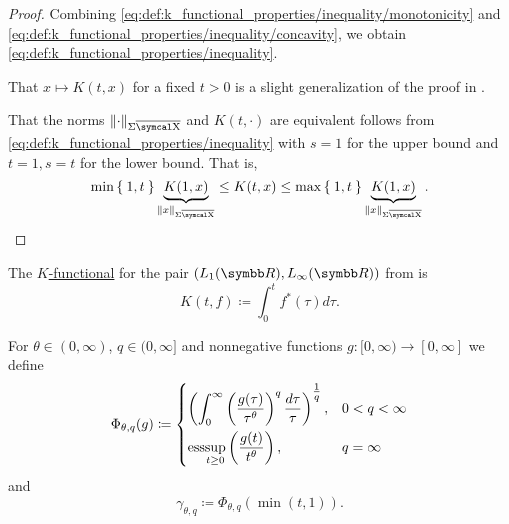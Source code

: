 \begin{proof}
  Combining \eqref{eq:def:k_functional_properties/inequality/monotonicity} and \eqref{eq:def:k_functional_properties/inequality/concavity}, we obtain \eqref{eq:def:k_functional_properties/inequality}.

   That \( x \mapsto K(t, x) \) for a fixed \( t > 0 \) is a slight generalization of the proof in .

  That the norms \( \Norm{\cdot}_{\Sigma \Ol{\CX}} \) and \( K(t, \cdot) \) are equivalent follows from \eqref{eq:def:k_functional_properties/inequality} with \( s = 1 \) for the upper bound and \( t = 1, s = t \) for the lower bound. That is,
  \begin{equation*}
    \min\Set{1, t} \underbrace{K(1, x)}_{\Norm{x}_{\Sigma \Ol{\CX}}} \leq K(t, x) \leq \max\Set{1, t} \underbrace{K(1, x)}_{\Norm{x}_{\Sigma \Ol{\CX}}}.
  \end{equation*}
\end{proof}

\begin{example}\label{thm:lp_interpolation_spaces/k_functional}
  The \hyperref[def:k_functional]{\( K \)-functional} for the pair \( (L_1(\BR), L_\infty(\BR)) \) from  is
  \begin{equation*}
    K(t, f) \coloneqq \int_0^t f^*(\tau) d\tau.
  \end{equation*}
\end{example}

\begin{definition}\label{def:lorenz_quasinorm}
  For \( \theta \in (0, \infty) \), \( q \in (0, \infty] \) and nonnegative functions \( g: [0, \infty) \to [0, \infty] \) we define
  \begin{equation}\label{eq:def:lorenz_quasinorm}
    \Phi_{\theta,q}(g) \coloneqq \begin{dcases}
      \left( \int_0^\infty \left( \frac {g(\tau)} {\tau^\theta} \right)^q \frac {d\tau} \tau \right)^{\tfrac 1 q}, &0 < q < \infty \\
      \operatorname{ess}\!\sup_{t \geq 0} \left( \frac {g(t)} {t^\theta} \right),                                                &q = \infty
    \end{dcases}
  \end{equation}
  and
  \begin{equation*}
    \gamma_{\theta,q} \coloneqq \Phi_{\theta,q}(\min(t, 1)).
  \end{equation*}
\end{definition}

